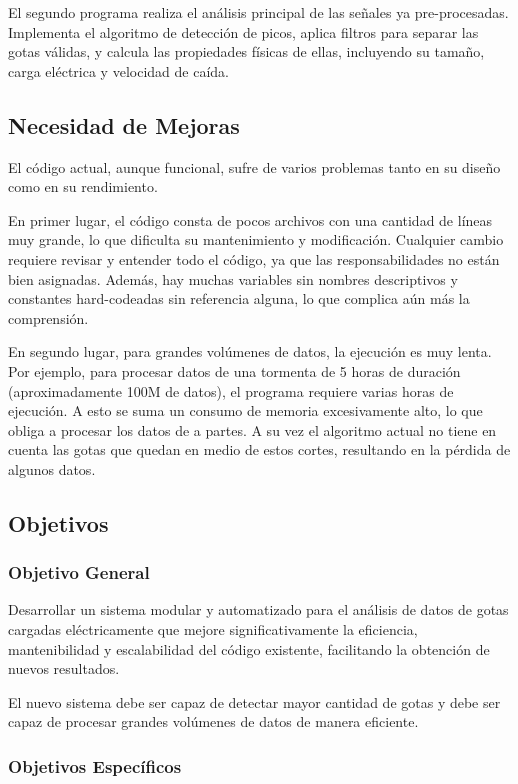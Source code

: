 \documentclass[12pt,a4paper]{article}
\begin{document}
El segundo programa realiza el análisis principal de las señales ya pre-procesadas. Implementa el algoritmo de detección de picos, aplica filtros para separar las gotas válidas, y calcula las propiedades físicas de ellas, incluyendo su tamaño, carga eléctrica y velocidad de caída.

\subsection{Necesidad de Mejoras}

El código actual, aunque funcional, sufre de varios problemas tanto en su diseño como en su rendimiento.

En primer lugar, el código consta de pocos archivos con una cantidad de líneas muy grande, lo que dificulta su mantenimiento y modificación. Cualquier cambio requiere revisar y entender todo el código, ya que las responsabilidades no están bien asignadas. Además, hay muchas variables sin nombres descriptivos y constantes hard-codeadas sin referencia alguna, lo que complica aún más la comprensión.

En segundo lugar, para grandes volúmenes de datos, la ejecución es muy lenta. Por ejemplo, para procesar datos de una tormenta de 5 horas de duración (aproximadamente 100M de datos), el programa requiere varias horas de ejecución. A esto se suma un consumo de memoria excesivamente alto, lo que obliga a procesar los datos de a partes. A su vez el algoritmo actual no tiene en cuenta las gotas que quedan en medio de estos cortes, resultando en la pérdida de algunos datos.

\subsection{Objetivos}

\subsubsection{Objetivo General}

Desarrollar un sistema modular y automatizado para el análisis de datos de gotas cargadas eléctricamente que mejore significativamente la eficiencia, mantenibilidad y escalabilidad del código existente, facilitando la obtención de nuevos resultados.

El nuevo sistema debe ser capaz de detectar mayor cantidad de gotas y debe ser capaz de procesar grandes volúmenes de datos de manera eficiente.

\subsubsection{Objetivos Específicos}
\end{document}
